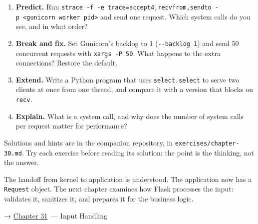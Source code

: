\label{30-kernel-application-handoff:exercises}

\begin{enumerate}
\def\labelenumi{\arabic{enumi}.}
\tightlist
\item
  \textbf{Predict.} Run \texttt{strace\ -}\allowbreak{}\texttt{f\ -}\allowbreak{}\texttt{e\ trace=}\allowbreak{}\texttt{accept4,}\allowbreak{}\texttt{recvfrom,}\allowbreak{}\texttt{sendto\ -}\allowbreak{}\texttt{p\ \textless{}gunicorn\ worker\ pid\textgreater{}} and send one request. Which system calls do you see, and in what order?
\item
  \textbf{Break and fix.} Set Gunicorn's backlog to 1 (\texttt{-\/-backlog\ 1}) and send 50 concurrent requests with \texttt{xargs\ -P\ 50}. What happens to the extra connections? Restore the default.
\item
  \textbf{Extend.} Write a Python program that uses \texttt{select.select} to serve two clients at once from one thread, and compare it with a version that blocks on \texttt{recv}.
\item
  \textbf{Explain.} What is a system call, and why does the number of system calls per request matter for performance?
\end{enumerate}

\noindent{}Solutions and hints are in the companion repository, in \texttt{exercises/}\allowbreak{}\texttt{chapter-30.md}. Try each exercise before reading its solution: the point is the thinking, not the answer.

\label{30-kernel-application-handoff:whats-next}

The handoff from kernel to application is understood. The application now has a \texttt{Request} object. The next chapter examines how Flask processes the input: validates it, sanitizes it, and prepares it for the business logic.

\noindent{}→ \hyperref[ch:31-input-handling]{Chapter 31}~--- Input Handling
